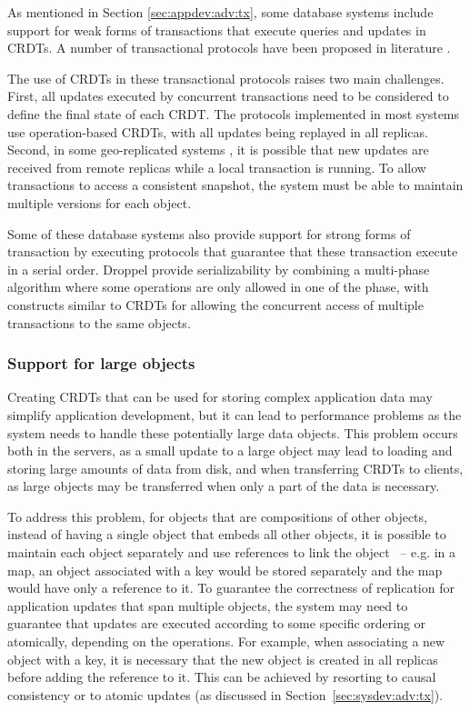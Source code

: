 \documentclass[12pt]{article}
\begin{document}
As mentioned in Section \ref{sec:appdev:adv:tx}, some database systems
include support for weak forms of transactions that execute queries and
updates in CRDTs.
A number of transactional protocols have been proposed in literature
\cite{swiftcloud,Akkoorath16Cure,Sovran11Transactional}.

The use of CRDTs in these transactional protocols raises two main challenges.
First, all updates executed by concurrent transactions need to be 
considered to define the final state of each CRDT. 
The protocols implemented in most systems 
\cite{swiftcloud,Akkoorath16Cure,Sovran11Transactional,Li14Automating} use operation-based CRDTs,
with all updates being replayed in all replicas.
Second, in some geo-replicated systems \cite{swiftcloud,Akkoorath16Cure}, 
it is possible that new updates are received from remote replicas while a local transaction is running.
To allow transactions to access a consistent snapshot, the system must
be able to maintain multiple versions for each object.

Some of these database systems \cite{Sovran11Transactional,Li14Automating} 
also provide support for strong forms of
transaction by executing protocols that guarantee that these transaction execute
in a serial order.
Droppel \cite{droppel} provide serializability by combining a multi-phase 
algorithm where some operations are only allowed in one of the phase, 
with constructs similar to CRDTs for allowing 
the concurrent access of multiple transactions to the same objects.

\subsubsection{Support for large objects}

Creating CRDTs that can be used for storing complex application data 
may simplify application development, but it can lead to performance
problems as the system needs to handle these potentially  
large data objects.
This problem occurs both in the servers, as a small update to a 
large object may lead to loading and storing large amounts of data
from disk, and when transferring CRDTs to clients, as large objects
may be transferred when only a part of the data is necessary.

To address this problem, for objects that are compositions of
other objects, instead of having a single object that embeds all other
objects, it is possible to maintain each object separately and use references 
to link the object~\cite{Meiklejohn14Composability} -- e.g. in a map, an object 
associated with a key would be stored separately and the map would have 
only a reference to it.
To guarantee the correctness of replication for application updates that 
span multiple objects, the system may need to guarantee that updates are
executed according to some specific ordering or atomically, depending 
on the operations. 
For example, when associating a new object with a key, it is necessary that
the new object is created in all replicas before adding the reference to 
it. This can be achieved by resorting to causal 
consistency \cite{cops,chainreaction,swiftcloud} or to atomic updates (as discussed 
in Section~\ref{sec:sysdev:adv:tx}).
\end{document}
